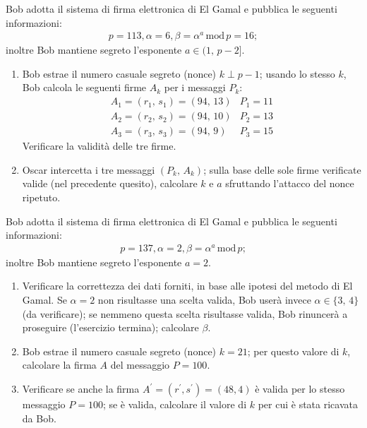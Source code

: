         Bob adotta il sistema di firma elettronica di El Gamal e pubblica le seguenti informazioni:
        \begin{gather*}
            p=113, \alpha = 6, \beta = \alpha^a\,\mathrm{mod}\,p=16
        ;\end{gather*}
        inoltre Bob mantiene segreto l'esponente $a\in (1,\,p-2]$.
        \begin{enumerate}
            \item Bob estrae il numero casuale segreto (nonce) $k\perp p-1$; usando lo stesso $k$, 
                Bob calcola le seguenti firme $A_k$ per i messaggi $P_k$:
                \[\begin{array}{ll}
                    A_1=(r_1,\,s_1)=(94,\,13) & P_1=11\\
                    A_2=(r_2,\,s_2)=(94,\,10) & P_2=13\\
                    A_3=(r_3,\,s_3)=(94,\,9) & P_3=15
                \end{array}\]
                Verificare la validità delle tre firme.
            \item Oscar intercetta i tre messaggi $(P_k,\,A_k)$; sulla base delle sole firme verificate valide 
                (nel precedente quesito), calcolare $k$ e $a$ sfruttando l'attacco del nonce ripetuto.
        \end{enumerate}

        Bob adotta il sistema di firma elettronica di El Gamal e pubblica le seguenti informazioni:
        \begin{gather*}
            p=137, \alpha = 2, \beta = \alpha^a\,\mathrm{mod}\,p
        ;\end{gather*}
        inoltre Bob mantiene segreto l'esponente $a=2$.
        \begin{enumerate}
            \item Verificare la correttezza dei dati forniti, in base alle ipotesi del metodo di El Gamal. 
                Se $\alpha=2$ non risultasse una scelta valida, Bob userà invece $\alpha\in \{3,\,4\}$ 
                (da verificare); se nemmeno questa scelta risultasse valida, Bob rinuncerà a proseguire 
                (l'esercizio termina); calcolare $\beta$.
            \item Bob estrae il numero casuale segreto (nonce) $k=21$; per questo valore di $k$, calcolare 
                la firma $A$ del messaggio $P=100$.
            \item Verificare se anche la firma $A^{\prime}=(r^{\prime}, s^{\prime})=(48,4)$ è valida per 
                lo stesso messaggio $P=100$; se è valida, calcolare il valore di $k$ per cui è stata ricavata da Bob.
        \end{enumerate}

